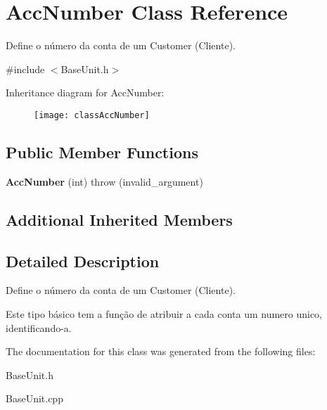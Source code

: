 \hypertarget{classAccNumber}{\section{Acc\-Number Class Reference}
\label{classAccNumber}
}


Define o número da conta de um Customer (Cliente).  




{\ttfamily \#include $<$Base\-Unit.\-h$>$}

Inheritance diagram for Acc\-Number\-:\begin{figure}[H]
\begin{center}
\leavevmode
\texttt{[image: classAccNumber]}
\end{center}
\end{figure}
\subsection*{Public Member Functions}
\begin{DoxyCompactItemize}
\item 
\hypertarget{classAccNumber_a11a8a2ea0849a83365960758a5ff3362}{{\bfseries Acc\-Number} (int)  throw (invalid\-\_\-argument)}\label{classAccNumber_a11a8a2ea0849a83365960758a5ff3362}

\end{DoxyCompactItemize}
\subsection*{Additional Inherited Members}


\subsection{Detailed Description}
Define o número da conta de um Customer (Cliente). 

Este tipo básico tem a função de atribuir a cada conta um numero unico, identificando-\/a. 

The documentation for this class was generated from the following files\-:\begin{DoxyCompactItemize}
\item 
Base\-Unit.\-h\item 
Base\-Unit.\-cpp\end{DoxyCompactItemize}
